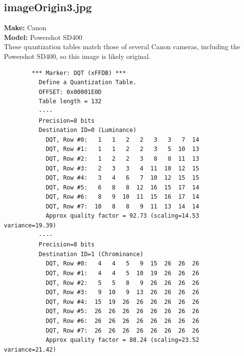 \documentclass{article}
\begin{document}
\subsection{imageOrigin3.jpg}
	\textbf{Make:} Canon\\
	\textbf{Model:} Powershot SD400\\
These quantization tables match those of several Canon cameras,
including the Powershot SD400, so this image is likely original.
\begin{lstlisting}
		*** Marker: DQT (xFFDB) ***
		  Define a Quantization Table.
		  OFFSET: 0x00001E0D
		  Table length = 132
		  ----
		  Precision=8 bits
		  Destination ID=0 (Luminance)
			DQT, Row #0:   1   1   2   2   3   3   7  14 
			DQT, Row #1:   1   1   2   2   3   5  10  13 
			DQT, Row #2:   1   2   2   3   8   8  11  13 
			DQT, Row #3:   2   3   3   4  11  10  12  15 
			DQT, Row #4:   3   4   6   7  10  12  15  15 
			DQT, Row #5:   6   8   8  12  16  15  17  14 
			DQT, Row #6:   8   9  10  11  15  16  17  14 
			DQT, Row #7:  10   8   8   9  11  13  14  14 
			Approx quality factor = 92.73 (scaling=14.53 variance=19.39)
		  ----
		  Precision=8 bits
		  Destination ID=1 (Chrominance)
			DQT, Row #0:   4   4   5   9  15  26  26  26 
			DQT, Row #1:   4   4   5  10  19  26  26  26 
			DQT, Row #2:   5   5   8   9  26  26  26  26 
			DQT, Row #3:   9  10   9  13  26  26  26  26 
			DQT, Row #4:  15  19  26  26  26  26  26  26 
			DQT, Row #5:  26  26  26  26  26  26  26  26 
			DQT, Row #6:  26  26  26  26  26  26  26  26 
			DQT, Row #7:  26  26  26  26  26  26  26  26 
			Approx quality factor = 88.24 (scaling=23.52 variance=21.42)
\end{lstlisting}
\end{document}
